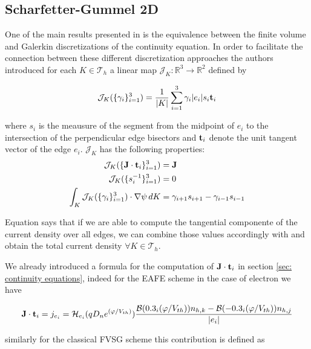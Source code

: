 \subsection{Scharfetter-Gummel 2D}

One of the main results presented in \cite{Bank:FEvsBOX} is the equivalence between the finite volume and Galerkin discretizations of the continuity equation. In order to facilitate the connection between these different discretization approaches the authors introduced for each $K \in \mathcal{T}_h$ a linear map $\mathcal{J}_{K}:\mathbb{R}^3\rightarrow\mathbb{R}^2$ defined by

\begin{equation}
\label{eq: map current}
\mathcal{J}_{K}(\{\gamma_i\}_{i=1}^3) = \dfrac{1}{|K|}\sum_{i=1}^3 \gamma_i |e_i| s_i \mathbf{t}_i
\end{equation}

where $s_i$ is the meausure of the segment from the midpoint  of $e_i$ to the intersection of the perpendicular edge bisectors and $\mathbf{t}_i$ denote the unit tangent vector of the edge $e_i$.
$\mathcal{J}_K$ has the following properties:
\begin{align}
\mathcal{J}_K(\{\mathbf{J}\cdot \mathbf{t}_i\}_{i=1}^3) & = \mathbf{J} \label{eq: map is current} \\
 \mathcal{J}_K(\{s_i^{-1}\}_{i=1}^3) & = 0 \\
 \int_K \mathcal{J}_K(\{\gamma_i\}_{i=1}^3) \cdot \nabla \psi \, dK & = \gamma_{i+1}s_{i+1} - \gamma_{i-1}s_{i-1}
\end{align}
 
 Equation  says that if we are able to compute the tangential componente of the current density over all edges, we can combine those values accordingly with  and obtain the total current density $\forall K \in \mathcal{T}_h$.
 
 We already introduced a formula for the computation of $\mathbf{J}\cdot \mathbf{t}_i$ in section \ref{sec: continuity equations}, indeed for the EAFE scheme in the case of electron we have
 
\begin{equation}
\label{eq: EAFE edge formula}
\small
\mathbf{J}\cdot \mathbf{t}_i = j_{e_i} = \mathcal{H}_{e_i}(qD_n e^{(\varphi/V_{th})}) \dfrac{\mathcal{B}(0.3_i(\varphi / V_{th}))n_{h,k} -  \mathcal{B}(-0.3_i(\varphi / V_{th}))n_{h,j}}{|e_i|}
\end{equation}

similarly for the classical FVSG scheme this contribution is defined as

